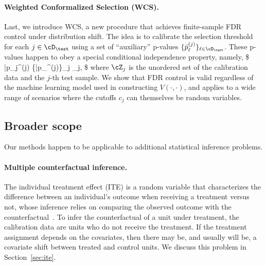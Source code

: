 \paragraph{Weighted Conformalized Selection (WCS).}
Last, we introduce WCS,
a new procedure
that achieves finite-sample FDR control under distribution shift.
The idea is to calibrate the selection threshold for each $j\in \cD_\test$
using a set of ``auxiliary'' p-values $\{\bar{p}_\ell^{(j)}\}_{\ell\in \cD_\test}$.
These p-values  happen to obey
a special conditional independence property, namely,
\$
\bar p_j^{(j)}  \indep \{\bar p_\ell^{(j)}\}_{\ell\neq j} \biggiven \cZ_j,
\$
where $\cZ_j$ is the unordered set of the calibration data
and the $j$-th test sample.
We show that FDR control is valid regardless
of the machine learning model used in constructing $V(\cdot,\cdot)$,
and applies to a wide range of scenarios where the cutoffs $c_{j}$ can themselves be random variables.


\subsection{Broader scope}

Our methods happen to be applicable to additional statistical inference problems.

\vspace{-0.3em}

\paragraph{Multiple counterfactual inference.}
The individual treatment effect (ITE) is a random variable
that characterizes the difference between an individual’s outcome
when receiving a treatment versus not, whose inference relies on comparing the observed outcome
with the counterfactual~\cite{imbens2015causal,lei2021conformal,jin2023sensitivity}. To infer the counterfactual of a unit under treatment,
the calibration data are units who do not receive the treatment.
If the treatment assignment depends on the covariates,
then there may be, and usually will be, a covariate shift between treated and control units.
We discuss this problem in Section~\ref{sec:ite}.


\vspace{-0.3em}
